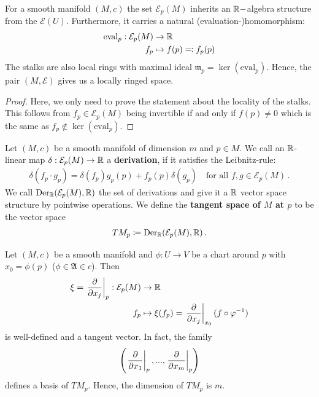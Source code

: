 \begin{corollary}
	For a smooth manifold $(M,c)$ the set $\mathcal{E}_p(M)$ inherits an $\mathbb{R}-$algebra structure from the $\mathcal{E}(U)$. Furthermore, it carries a natural (evaluation-)homomorphism:
	\begin{align*}
		\mathrm{eval}_p: \mathcal{E}_p(M) & \to \mathbb{R} \\
		f_p  & \mapsto f(p)\eqcolon f_p(p)
	\end{align*}
	The stalks are also local rings with maximal ideal $\mathfrak{m}_p=\ker(\mathrm{eval}_p)$. Hence, the pair $(M,\mathcal{E})$ gives us a locally ringed space.
\end{corollary}
\begin{proof}
	Here, we only need to prove the statement about the locality of the stalks. This follows from $f_p\in \mathcal{E}_p(M)$ being invertible if and only if $f(p)\neq 0$ which is the same as $f_p\notin \ker(\mathrm{eval}_p)$.
\end{proof}
\begin{definition}
	Let $(M,c)$ be a smooth manifold of dimension $m$ and $p\in M$. We call an $\mathbb{R}$-linear map $\delta:\mathcal{E}_p(M)\to \mathbb{R}$ a \textbf{derivation}, if it satisfies the Leibnitz-rule:
	\begin{align*}
		\delta(f_p\cdot g_p)=\delta(f_p)g_p(p)+f_p(p)\delta(g_p) \quad \text{for all }f,g\in \mathcal{E}_p(M) \, .
	\end{align*}
	We call $\mathrm{Der}_{\mathbb{R}}(\mathcal{E}_p(M),\mathbb{R})$ the set of derivations and give it a $\mathbb{R}$ vector space structure by pointwise operations. We define the \textbf{tangent space of $M$ at $p$} to be the vector space
	\begin{align*}
		TM_p \coloneq \mathrm{Der}_{\mathbb{R}}(\mathcal{E}_p(M),\mathbb{R}) \, .
	\end{align*}
\end{definition}
\begin{corollary}
	Let $(M,c)$ be a smooth manifold and $\phi:U\to V$ be a chart around $p$ with $x_0=\phi(p)$ ($\phi \in \mathfrak{A}\in c$). Then 
	\begin{align*}
		\xi=\left.\frac{\partial}{\partial x_j}\right|_{p} : \mathcal{E}_p(M) &\to \mathbb{R} \\
		f_p & \mapsto \xi(f_p)=\left.\frac{\partial}{\partial x_j}\right|_{x_0}(f\circ \varphi^{-1} )
	\end{align*} is well-defined and a tangent vector. In fact, the family
	\begin{align*}
		\left( \left.\frac{\partial}{\partial x_1}\right|_{p},...,\left.\frac{\partial}{\partial x_m}\right|_{p}\right)
	\end{align*} defines a basis of $TM_p$. Hence, the dimension of $TM_p$ is $m$.
\end{corollary}
